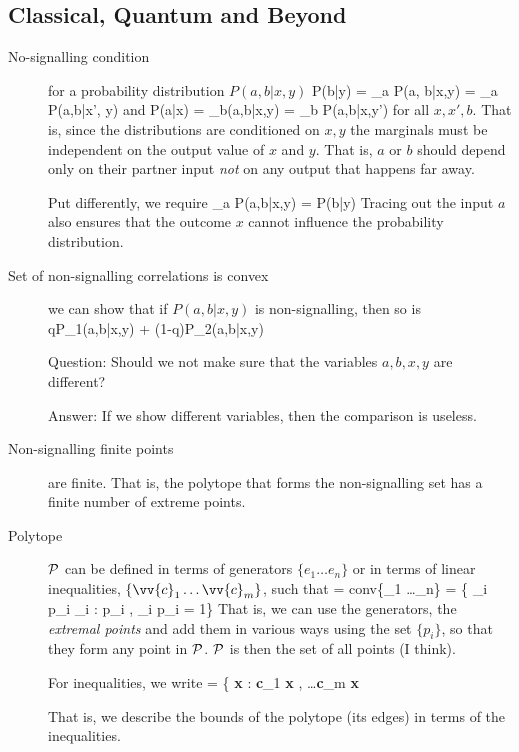 \subsection{Classical, Quantum and Beyond}
\begin{description}
\item[No-signalling condition] for a probability distribution $P(a, b|x,y)$
\beq
P(b|y) = \sum_a P(a, b|x,y) = \sum_a P(a,b|x', y)
\eeq
and
\beq
P(a|x) = \sum_b(a,b|x,y) = \sum_b P(a,b|x,y')
\eeq
for all $x,x',b$. That is, since the distributions are conditioned on $x,y$ the marginals must be independent on the output value of $x$ and $y$. That is, $a$ or $b$ should depend only on their partner input \emph{not} on any output that happens far away. 

Put differently, we require
\beq
\sum_a P(a,b|x,y) = P(b|y)
\eeq
Tracing out the input $a$ also ensures that the outcome $x$ cannot influence the probability distribution. 


\item[Set of non-signalling correlations is convex] we can show that if $P(a,b|x,y)$ is non-signalling, then so is 
\beq
qP_1(a,b|x,y) + (1-q)P_2(a,b|x,y)
\eeq

Question: Should we not make sure that the variables $a,b,x,y$ are different? 

Answer: If we show different variables, then the comparison is useless. 

\item[Non-signalling finite points] are finite. That is, the polytope that forms the non-signalling set has a finite number of extreme points. 

\item[Polytope] $\cal{P}$ can be defined in terms of generators $\{e_1\ldots e_n\}$ or in terms of linear inequalities, $\{ \vv{c}_1 \ldots \vv{c}_m\}$, such that 
\beq
{} = \mbox{conv}\{_1 \ldots {}_n\} = \left\{ \sum_i p_i _i : p_i , \sum_i p_i = 1\right\}
\eeq
That is, we can use the generators, the \emph{extremal points} and add them in various ways using the set $\{p_i\}$, so that they form any point in $\cal{P}$. $\cal{P}$ is then the set of all points (I think). 

For inequalities, we write
\beq
{} = \{ \textbf{x} : \textbf{c}_1 \cdot \textbf{x}  , \ldots \textbf{c}_m \cdot \textbf{x} 
\eeq

That is, we describe the bounds of the polytope (its edges) in terms of the inequalities. 


\end{description}
